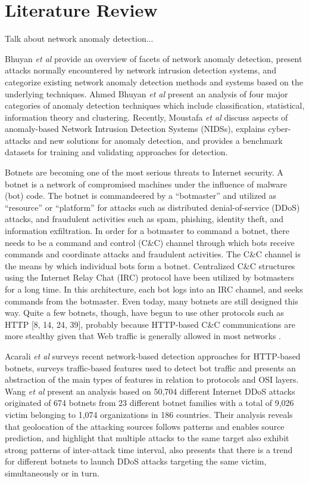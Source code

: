\documentclass[review]{elsarticle}
\begin{document}
\section{Literature Review}
\label{sec:review}

Talk about network anomaly detection... 

Bhuyan \emph{et al} \cite{acarali2016survey} provide an overview of facets of network anomaly detection, present attacks normally encountered by network intrusion detection systems, and categorize existing network anomaly detection methods and systems based on the underlying techniques. Ahmed Bhuyan \emph{et al} \cite{acarali2016survey} present an analysis of four major categories of anomaly detection techniques which include classification, statistical, information theory and clustering. Recently, Moustafa \emph{et al} \cite{moustafa2019holistic} discuss aspects of anomaly-based Network Intrusion Detection Systems (NIDSs), explains cyber-attacks and new solutions for anomaly detection, and provides a benchmark datasets for training and validating approaches for detection. 

Botnets are becoming one of the most serious threats to Internet security. A botnet is a network of compromised machines under the influence of malware (bot) code. The botnet is commandeered by a “botmaster” and utilized as “resource” or “platform” for attacks such as distributed denial-of-service (DDoS) attacks, and fraudulent activities such as spam, phishing, identity theft, and information exfiltration. In order for a botmaster to command a botnet, there needs to be a command and control (C\&C) channel through which bots receive commands and coordinate attacks and fraudulent activities. The C\&C channel is the means by which individual bots form a botnet. Centralized C\&C structures using the Internet Relay Chat (IRC) protocol have been utilized by botmasters for a long time. In this architecture, each bot logs into an IRC channel, and seeks commands from the botmaster. Even today, many botnets are still designed this way. Quite a few botnets, though, have begun to use other protocols such as HTTP [8, 14, 24, 39], probably because HTTP-based C\&C communications are more stealthy given that Web traffic is generally allowed in most networks \cite{gu2008botminer}.

Acarali \emph{et al} \cite{acarali2016survey} surveys recent network-based detection approaches for HTTP-based botnets, surveys traffic-based features used to detect bot traffic and presents an abstraction of the main types of features in relation to protocols and OSI layers. Wang \emph{et al} \cite{Wang2018ddosbotnetssurvey} present an analysis based on 50,704 different Internet DDoS attacks originated of 674 botnets from 23 different botnet families with a total of 9,026 victim belonging to 1,074 organizations in 186 countries. Their analysis reveals that geolocation of the attacking sources follows patterns and enables source prediction, and highlight that multiple attacks to the same target also exhibit strong patterns of inter-attack time interval, also presents that there is a trend for different botnets to launch DDoS attacks targeting the same victim, simultaneously or in turn.
\end{document}
